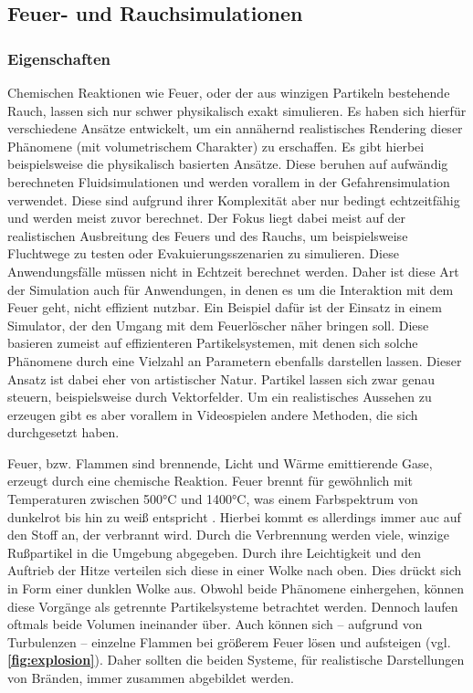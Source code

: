 \subsection{Feuer- und Rauchsimulationen}

\subsubsection{Eigenschaften}
Chemischen Reaktionen wie Feuer, oder der aus winzigen Partikeln bestehende Rauch,
lassen sich nur schwer physikalisch exakt simulieren. Es haben sich hierfür verschiedene Ansätze entwickelt, um ein
annähernd realistisches Rendering dieser Phänomene (mit volumetrischem Charakter) zu erschaffen. 
Es gibt hierbei beispielsweise die physikalisch basierten Ansätze. 
Diese beruhen auf aufwändig berechneten Fluidsimulationen und werden vorallem in der Gefahrensimulation verwendet.
Diese sind aufgrund ihrer Komplexität aber nur bedingt echtzeitfähig und werden meist zuvor berechnet. 
Der Fokus liegt dabei meist auf der realistischen Ausbreitung des Feuers und des Rauchs, um beispielsweise Fluchtwege 
zu testen oder Evakuierungsszenarien zu simulieren. Diese Anwendungsfälle müssen nicht in Echtzeit berechnet werden.
Daher ist diese Art der Simulation auch für Anwendungen, in denen es um die Interaktion mit dem Feuer geht, nicht 
effizient nutzbar. Ein Beispiel dafür ist der Einsatz in einem Simulator, der den Umgang mit dem Feuerlöscher
näher bringen soll. Diese basieren zumeist auf effizienteren Partikelsystemen, mit denen sich solche Phänomene 
durch eine Vielzahl an Parametern ebenfalls darstellen lassen. Dieser Ansatz ist dabei eher von artistischer Natur. 
Partikel lassen sich zwar genau steuern, beispielsweise durch Vektorfelder. Um ein realistisches Aussehen zu 
erzeugen gibt es aber vorallem in Videospielen andere Methoden, die sich durchgesetzt haben. 

Feuer, bzw. Flammen sind brennende, Licht und Wärme emittierende Gase, erzeugt durch eine chemische Reaktion. 
Feuer brennt für gewöhnlich mit Temperaturen zwischen 500°C und 1400°C, was einem Farbspektrum von dunkelrot bis hin zu weiß entspricht \parencite{Schmidt2011}.
Hierbei kommt es allerdings immer auc auf den Stoff an, der verbrannt wird.  
Durch die Verbrennung werden viele, winzige Rußpartikel in die Umgebung abgegeben. Durch ihre Leichtigkeit und den 
Auftrieb der Hitze verteilen sich diese in einer Wolke nach oben. Dies drückt sich in Form einer dunklen Wolke aus.
Obwohl beide Phänomene einhergehen, können diese Vorgänge als getrennte Partikelsysteme betrachtet werden.
Dennoch laufen oftmals beide Volumen ineinander über. Auch können sich – aufgrund von Turbulenzen – einzelne Flammen bei größerem Feuer lösen
und aufsteigen (vgl. \textbf{\autoref{fig:explosion}}).
Daher sollten die beiden Systeme, für realistische Darstellungen von Bränden, immer zusammen abgebildet werden.

